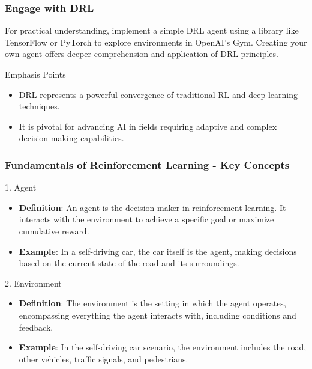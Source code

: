 \documentclass[aspectratio=169]{beamer}
\begin{document}
\begin{frame}[fragile]
    \frametitle{Engage with DRL}
    For practical understanding, implement a simple DRL agent using a library like TensorFlow or PyTorch to explore environments in OpenAI's Gym. Creating your own agent offers deeper comprehension and application of DRL principles.
    
    \begin{block}{Emphasis Points}
        \begin{itemize}
            \item DRL represents a powerful convergence of traditional RL and deep learning techniques.
            \item It is pivotal for advancing AI in fields requiring adaptive and complex decision-making capabilities.
        \end{itemize}
    \end{block}
\end{frame}

\begin{frame}[fragile]
    \frametitle{Fundamentals of Reinforcement Learning - Key Concepts}
    \begin{block}{1. Agent}
        \begin{itemize}
            \item \textbf{Definition}: An agent is the decision-maker in reinforcement learning. It interacts with the environment to achieve a specific goal or maximize cumulative reward.
            \item \textbf{Example}: In a self-driving car, the car itself is the agent, making decisions based on the current state of the road and its surroundings.
        \end{itemize}
    \end{block}

    \begin{block}{2. Environment}
        \begin{itemize}
            \item \textbf{Definition}: The environment is the setting in which the agent operates, encompassing everything the agent interacts with, including conditions and feedback.
            \item \textbf{Example}: In the self-driving car scenario, the environment includes the road, other vehicles, traffic signals, and pedestrians.
        \end{itemize}
    \end{block}
\end{frame}
\end{document}
